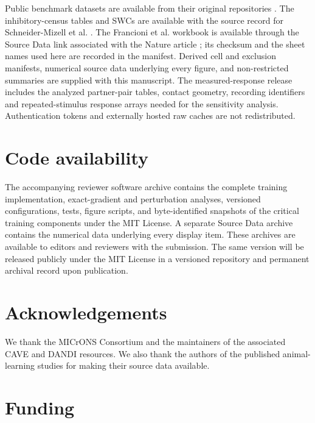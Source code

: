 \documentclass[11pt]{article}
\newcommand{\journalbibliography}{journal/references}
\newcommand{\journalbibliographystyle}{journal/naturemag}
\newcommand{\journalbibliography}{references}
\newcommand{\journalbibliographystyle}{naturemag}
\begin{document}
Public benchmark datasets are available from their original repositories \citep{lecun1998mnist,xiao2017fashionmnist,krizhevsky2009cifar}.
The inhibitory-census tables and SWCs are available with the source record for
Schneider-Mizell et al. \citep{schneidermizell2025inhibitory}. The Francioni
et al. workbook is available through the Source Data link associated with the
Nature article \citep{francioni2026vectorized}; its checksum and the sheet
names used here are recorded in the manifest. Derived cell and exclusion
manifests, numerical source data underlying every figure, and non-restricted
summaries are supplied with this manuscript. The measured-response release includes the analyzed partner-pair tables, contact geometry, recording identifiers and repeated-stimulus response arrays needed for the sensitivity analysis. Authentication tokens and
externally hosted raw caches are not redistributed.

\section*{Code availability}

The accompanying reviewer software archive contains the complete training
implementation, exact-gradient and perturbation analyses, versioned
configurations, tests, figure scripts, and byte-identified snapshots of the
critical training components under the MIT License. A separate Source Data
archive contains the numerical data underlying every display item. These
archives are available to editors and reviewers with the submission. The same
version will be released publicly under the MIT License in a versioned
repository and permanent archival record upon publication.

\setlength{\bibsep}{2pt}



\section*{Acknowledgements}

We thank the MICrONS Consortium and the maintainers of the associated CAVE
and DANDI resources. We also thank the authors of the published animal-learning
studies for making their source data available.

\section*{Funding}
\end{document}

